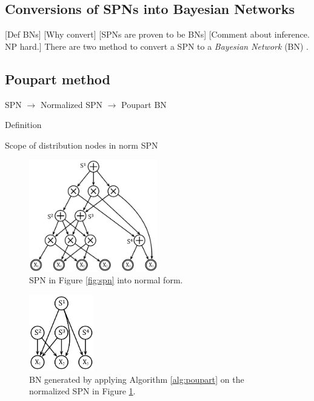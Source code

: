 \subsection{Conversions of SPNs into Bayesian Networks}

[Def BNs]
[Why convert]
[SPNs are proven to be BNs]
[Comment about inference. NP hard.]
There are two method to convert a SPN to a \emph{Bayesian Network} (BN) \cite{pear88}.

\subsection{Poupart method}

SPN $\rightarrow$ Normalized SPN $\rightarrow$ Poupart BN

Definition

Scope of distribution nodes in norm SPN

\begin{figure}[h]
    \begin{center}
		\includegraphics[width=0.5\textwidth]{figures/norm_SPN.png}
		\caption{SPN in Figure \ref{fig:spn} into normal form.}
	\label{fig:norm_spn}
    \end{center}
\end{figure}

\begin{figure}[h]
    \begin{center}
		\includegraphics[width=0.25\textwidth]{figures/bn_poupart.png}
		\caption{BN generated by applying Algorithm \ref{alg:poupart} on the normalized SPN in Figure \ref{fig:norm_spn}.}
	\label{fig:bn_poupart}
    \end{center}
\end{figure}

